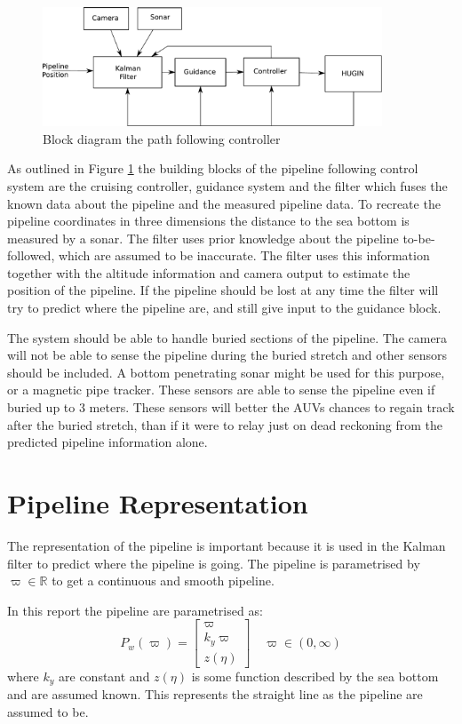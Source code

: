 	\begin{figure}[hbtp]
		\centering
		\includegraphics[width=0.9\textwidth]{pics/blockdiagram}
		\caption{Block diagram the path following controller}
		\label{fig:ch2-blockdiagram}
	\end{figure}
	As outlined in Figure \ref{fig:ch2-blockdiagram} the building blocks of the pipeline following
	control system are the cruising controller, guidance system and the filter
	which fuses the known data about the pipeline and the measured pipeline data. To recreate the 
	pipeline coordinates in three dimensions the distance to the sea bottom is measured by a sonar. The
	filter uses prior knowledge about the pipeline to-be-followed, which are assumed to be inaccurate. 
	The filter uses this information together with the altitude information and camera output to estimate the
	position of the pipeline. If the pipeline should be lost at any time the filter will try to predict
	where the pipeline are, and still give input to the guidance block.
	
	The system should be able to handle buried sections of the pipeline. The camera will not be able to
	sense the pipeline during the buried stretch and other sensors should be included. A bottom
	penetrating sonar might be used for this purpose, or a magnetic pipe tracker. These sensors are able
	to sense the pipeline even if buried up to 3 meters. \cite{PhD_lecture} These sensors will better the
	AUVs chances to regain track after the buried stretch, than if it were to relay just on dead
	reckoning from the predicted pipeline information alone.

\section{Pipeline Representation}
	The representation of the pipeline is important because it is used in the Kalman filter to predict
	where the pipeline is going. The pipeline is parametrised by $\varpi \in \mathbb{R}$ to get a
	continuous and smooth pipeline.

	In this report the pipeline are parametrised as:
	\begin{equation}
		P_w(\varpi) = \left [ \begin{array}{c}
					\varpi \\
					k_y \varpi \\
					z(\eta)
				\end{array} \right ] \quad \varpi \in (0, \infty)
	\end{equation}
	where $k_y$ are constant and $z(\eta)$ is some function described by the sea bottom and are assumed
	known. This represents the straight line as the pipeline are assumed to be.
	
